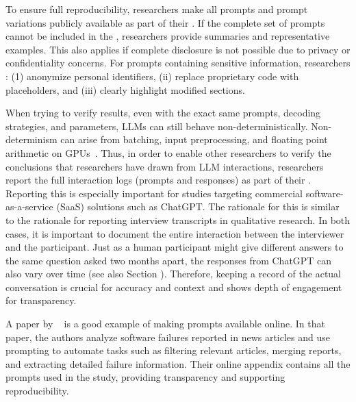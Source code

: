 To ensure full reproducibility, researchers \must make all prompts and prompt variations publicly available as part of their \supplementarymaterial.
If the complete set of prompts cannot be included in the \paper, researchers \should provide summaries and representative examples.
This also applies if complete disclosure is not possible due to privacy or confidentiality concerns.
For prompts containing sensitive information, researchers \must: (1) anonymize personal identifiers, (ii) replace proprietary code with placeholders, and (iii) clearly highlight modified sections.

When trying to verify results, even with the exact same prompts, decoding strategies, and parameters, LLMs can still behave non-deterministically.
Non-determinism can arise from batching, input preprocessing, and floating point arithmetic on GPUs~\cite{Chann2023}.
Thus, in order to enable other researchers to verify the conclusions that researchers have drawn from LLM interactions, researchers \should report the full interaction logs (prompts and responses) as part of their \supplementarymaterial.
Reporting this is especially important for studies targeting commercial software-as-a-service (SaaS) solutions such as ChatGPT.
The rationale for this is similar to the rationale for reporting interview transcripts in qualitative research.
In both cases, it is important to document the entire interaction between the interviewer and the participant.
Just as a human participant might give different answers to the same question asked two months apart, the responses from ChatGPT can also vary over time (see also Section \subjects).
Therefore, keeping a record of the actual conversation is crucial for accuracy and context and shows depth of engagement for transparency.


A paper by \citeauthor{anandayuvaraj2024fail}~\cite{anandayuvaraj2024fail} is a good example of making prompts available online.
In that paper, the authors analyze software failures reported in news articles and use prompting to automate tasks such as filtering relevant articles, merging reports, and extracting detailed failure information.
Their online appendix contains all the prompts used in the study, providing transparency and supporting reproducibility.

